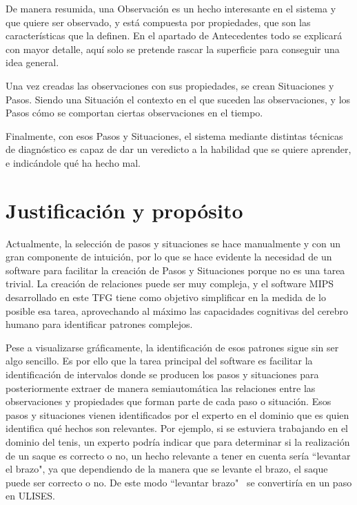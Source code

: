 De manera resumida, una Observaci\'on es un hecho interesante en el sistema y que quiere ser observado, y 
est\'a compuesta por propiedades, que son las caracter\'isticas que la definen. En el 
apartado de Antecedentes todo se explicar\'a con mayor detalle, aqu\'i solo se pretende rascar la superficie para 
conseguir una idea general.

Una vez creadas las observaciones con sus propiedades, se crean Situaciones y Pasos. Siendo una Situaci\'on el contexto
en el que suceden las observaciones, y los Pasos c\'omo se comportan ciertas observaciones en el tiempo.

Finalmente, con esos Pasos y Situaciones, el sistema mediante distintas t\'ecnicas de diagn\'ostico 
es capaz de dar un veredicto
a la habilidad que se quiere aprender, e indic\'andole qu\'e ha hecho mal.

\section{Justificaci\'{o}n y prop\'osito}
Actualmente, la selecci\'on de pasos y situaciones se hace manualmente y con un gran componente de intuici\'on,
por lo que se hace evidente la necesidad de un software para facilitar la creaci\'on de Pasos y Situaciones porque
no es una tarea trivial. La creaci\'on de relaciones puede ser muy compleja, y el software MIPS desarrollado
en este TFG
tiene como objetivo simplificar en la medida de lo posible esa tarea, aprovechando al m\'aximo las capacidades
cognitivas del cerebro humano para identificar
patrones complejos. 

Pese a visualizarse gr\'aficamente, la identificaci\'on de esos patrones sigue sin ser algo sencillo. Es
por ello que la tarea principal del software es facilitar la identificaci\'on de intervalos donde se producen los
pasos y situaciones para posteriormente extraer de manera semiautom\'atica las relaciones entre las observaciones y
propiedades que forman parte de cada paso o situaci\'on. Esos pasos y situaciones vienen identificados por el
experto en el dominio que es quien identifica qu\'e hechos son relevantes. 
Por ejemplo, si se estuviera trabajando en el dominio del tenis, un experto podr\'ia indicar que 
para determinar si la realizaci\'on de un saque es correcto o no, un hecho relevante a tener en cuenta ser\'ia 
``levantar el brazo", ya que dependiendo de la manera que se levante el brazo, el saque puede ser correcto o 
no. De este modo ``levantar brazo" \ se convertir\'ia en un paso en ULISES.

